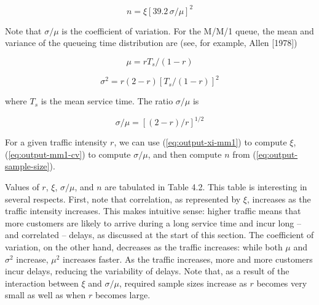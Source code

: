 \begin{equation}
n = \xi \left[39.2 \, \sigma/\mu \right]^2
\label{eq:output-sample-size}
\end{equation}

Note that $\sigma/\mu$ is the coefficient of variation. For the M/M/1 queue,
the mean and variance of the queueing time distribution are (see, for example,
Allen [1978])

\begin{equation}
\mu = r T_s / (1 - r)
\label{eq:output-mm1-mean}
\end{equation}

\begin{equation}
\sigma^2 = r(2 - r)\left[T_s/(1 - r)\right]^2
\label{eq:output-mm1-variance}
\end{equation}

where $T_s$ is the mean service time. The ratio $\sigma/\mu$ is

\begin{equation}
\sigma/\mu = \left[(2 - r)/r\right]^{1/2}
\label{eq:output-mm1-cv}
\end{equation}

For a given traffic intensity $r$, we can use (\ref{eq:output-xi-mm1}) to
compute $\xi$, (\ref{eq:output-mm1-cv}) to compute $\sigma/\mu$, and then
compute $n$ from (\ref{eq:output-sample-size}).



Values of $r$, $\xi$, $\sigma/\mu$, and $n$ are tabulated in Table 4.2. This
table is interesting in several respects. First, note that correlation, as
represented by $\xi$, increases as the traffic intensity increases. This makes
intuitive sense:
\noindent higher traffic means that more customers are likely to arrive
during a long service time and incur long -- and correlated -- delays, as
discussed at the start of this section. The coefficient of variation, on the
other hand, decreases as the traffic increases: while both $\mu$ and
$\sigma^2$ increase, $\mu^2$ increases faster. As the traffic increases, more
and more customers incur delays, reducing the variability of delays. Note
that, as a result of the interaction between $\xi$ and $\sigma/\mu$, required
sample sizes increase as $r$ becomes very small as well as when $r$ becomes
large.

